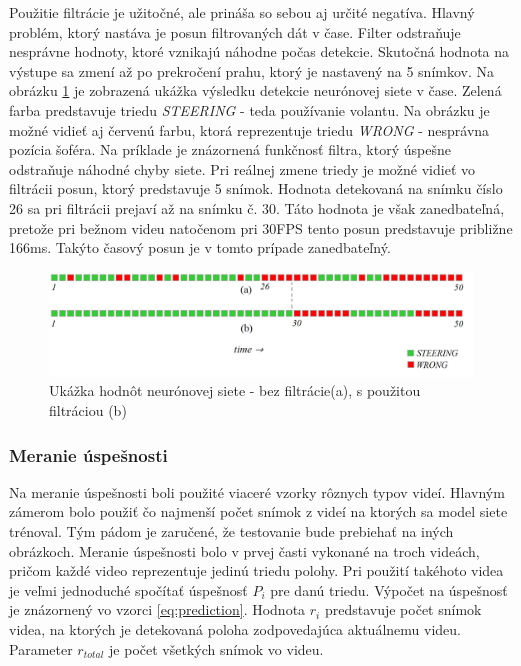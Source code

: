 \documentclass[slovak,master,dept460,male,cpp,cpdeclaration]{diploma}
\begin{document}
 Použitie filtrácie je  užitočné, ale  prináša so sebou aj určité negatíva. Hlavný problém, ktorý nastáva je posun  filtrovaných dát v čase. Filter  odstraňuje nesprávne hodnoty, ktoré vznikajú náhodne počas detekcie. Skutočná hodnota na výstupe sa zmení až po prekročení  prahu, ktorý je nastavený na 5 snímkov. Na obrázku \ref{fig:nnfilter} je zobrazená ukážka výsledku detekcie neurónovej siete v čase. Zelená farba predstavuje triedu \textit{STEERING} - teda používanie volantu. Na obrázku je možné vidieť aj červenú farbu, ktorá reprezentuje triedu \textit{WRONG} - nesprávna pozícia šoféra. Na príklade je znázornená funkčnosť filtra, ktorý úspešne odstraňuje náhodné chyby siete. Pri reálnej zmene triedy je možné vidieť vo filtrácii posun, ktorý predstavuje 5 snímok. Hodnota detekovaná na snímku číslo 26 sa  pri filtrácii prejaví až na snímku č. 30. Táto hodnota je však zanedbateľná, pretože pri bežnom videu natočenom  pri 30FPS tento posun predstavuje približne 166ms. Takýto časový posun je  v tomto prípade zanedbateľný.
 
 
\begin{figure}[H]
	\centering
	\includegraphics[width=1\textwidth]{Figures/nnfiltertime.png}
	\caption{Ukážka hodnôt neurónovej siete - bez filtrácie(a), s použitou filtráciou (b)}
	\label{fig:nnfilter}
\end{figure}

\newpage
\subsubsection*{Meranie úspešnosti}
Na meranie úspešnosti boli použité viaceré vzorky rôznych typov videí. Hlavným zámerom bolo použiť čo najmenší počet  snímok z videí na ktorých sa model siete trénoval. Tým pádom je zaručené, že testovanie bude prebiehať na  iných  obrázkoch. Meranie úspešnosti bolo v prvej časti vykonané na troch videách, pričom každé video reprezentuje  jedinú triedu polohy. Pri použití takéhoto videa je  veľmi jednoduché spočítať  úspešnosť $P_i$ pre danú triedu. Výpočet na úspešnosť je znázornený vo vzorci \ref{eq:prediction}. Hodnota $r_i$ predstavuje počet snímok videa, na ktorých je detekovaná poloha zodpovedajúca aktuálnemu videu. Parameter $r_{total}$ je počet všetkých snímok vo videu. 
\end{document}
